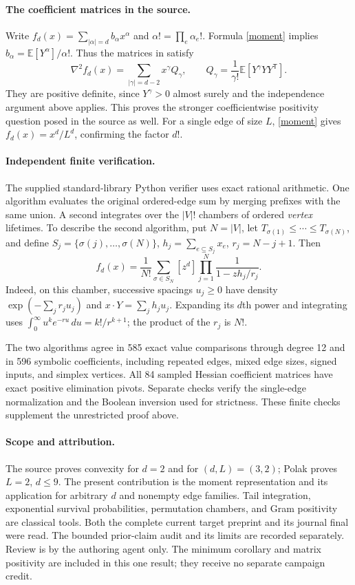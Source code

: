 \documentclass[11pt]{article}
\newcommand{\E}{\mathbb E}
\begin{document}
\paragraph{The coefficient matrices in the source.}
Write $f_d(x)=\sum_{|\alpha|=d}b_\alpha x^\alpha$ and
$\alpha!=\prod_e\alpha_e!$. Formula \eqref{moment} implies
$b_\alpha=\E[Y^\alpha]/\alpha!$. Thus the matrices in
\cite[Lemmas 4.1 and 4.3]{BLS} satisfy
\begin{equation}\label{gram}
 \nabla^2f_d(x)=\sum_{|\gamma|=d-2}x^\gamma Q_\gamma,
 \qquad Q_\gamma=\frac1{\gamma!}\E[Y^\gamma YY^{\mathsf T}].
\end{equation}
They are positive definite, since $Y^\gamma>0$ almost surely and
the independence argument above applies. This proves the stronger
coefficientwise positivity question posed in the source as well.
For a single edge of size $L$, \eqref{moment} gives
$f_d(x)=x^d/L^d$, confirming the factor $d!$.

\paragraph{Independent finite verification.}
The supplied standard-library Python verifier uses exact rational
arithmetic. One algorithm evaluates the original ordered-edge sum
by merging prefixes with the same union. A second integrates over
the $|V|!$ chambers of ordered \emph{vertex} lifetimes. To describe
the second algorithm, put $N=|V|$, let
$T_{\sigma(1)}\leq\cdots\leq T_{\sigma(N)}$, and define
$S_j=\{\sigma(j),\ldots,\sigma(N)\}$,
$h_j=\sum_{e\subseteq S_j}x_e$, $r_j=N-j+1$. Then
\[
 f_d(x)=\frac1{N!}\sum_{\sigma\in S_N}
 [z^d]\prod_{j=1}^N\frac1{1-z h_j/r_j}.
\]
Indeed, on this chamber, successive spacings $u_j\geq0$ have
density $\exp(-\sum_jr_ju_j)$ and $x\cdot Y=\sum_jh_ju_j$.
Expanding its $d$th power and integrating uses
$\int_0^\infty u^k e^{-ru}\,du=k!/r^{k+1}$;
the product of the $r_j$ is $N!$.

The two algorithms agree in 585 exact value comparisons through
degree 12 and in 596 symbolic coefficients, including repeated
edges, mixed edge sizes, signed inputs, and simplex vertices.
All 84 sampled Hessian coefficient matrices have exact positive
elimination pivots. Separate checks verify the single-edge
normalization and the Boolean inversion used for strictness.
These finite checks supplement the unrestricted proof above.

\paragraph{Scope and attribution.}
The source proves convexity for $d=2$ and for $(d,L)=(3,2)$;
Polak \cite{Polak} proves $L=2$, $d\leq9$.
The present contribution is the moment representation and its
application for arbitrary $d$ and nonempty edge families.
Tail integration, exponential survival probabilities, permutation
chambers, and Gram positivity are classical tools.
Both the complete current target preprint and its journal final
were read. The bounded prior-claim audit and its limits are recorded
separately. Review is by the authoring agent only. The minimum
corollary and matrix positivity are included in this one result;
they receive no separate campaign credit.
\end{document}
